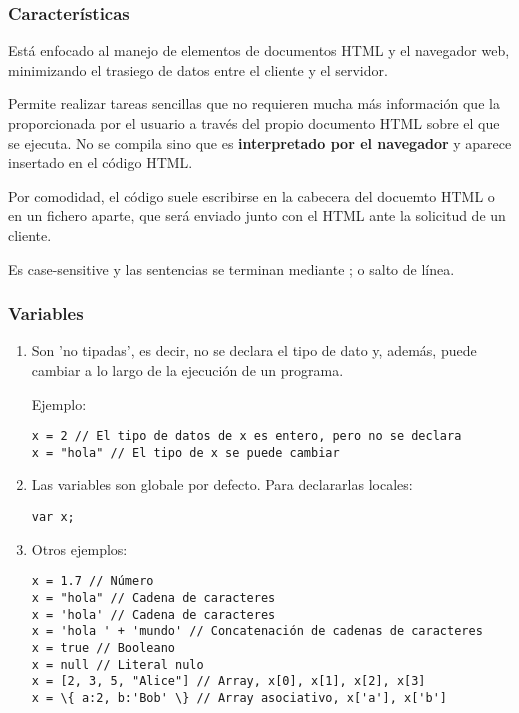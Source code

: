 \documentclass{apuntes}
\begin{document}
\subsubsection{Características}
Está enfocado al manejo de elementos de documentos HTML y el navegador web, minimizando el trasiego de datos entre el cliente y el servidor.

Permite realizar tareas sencillas que no requieren mucha más información que la proporcionada por el usuario a través del propio documento HTML sobre el que se ejecuta. No se compila sino que es \textbf{interpretado por el navegador} y aparece insertado en el código HTML.

Por comodidad, el código suele escribirse en la cabecera del docuemto HTML o en un fichero aparte, que será enviado junto con el HTML ante la solicitud de un cliente.

Es case-sensitive y las sentencias se terminan mediante ; o salto de línea.
\subsubsection{Variables}
\begin{enumerate}
\item Son 'no tipadas', es decir, no se declara el tipo de dato y, además, puede cambiar a lo largo de la ejecución de un programa.

Ejemplo:

\begin{verbatim}
x = 2 // El tipo de datos de x es entero, pero no se declara
x = "hola" // El tipo de x se puede cambiar
\end{verbatim}
\item Las variables son globale por defecto. Para declararlas locales:
\begin{verbatim}
var x;
 \end{verbatim}
\item Otros ejemplos:

\begin{verbatim}
x = 1.7 // Número
x = "hola" // Cadena de caracteres
x = 'hola' // Cadena de caracteres
x = 'hola ' + 'mundo' // Concatenación de cadenas de caracteres
x = true // Booleano
x = null // Literal nulo
x = [2, 3, 5, "Alice"] // Array, x[0], x[1], x[2], x[3]
x = \{ a:2, b:'Bob' \} // Array asociativo, x['a'], x['b']
\end{verbatim}
\end{enumerate}
\end{document}
